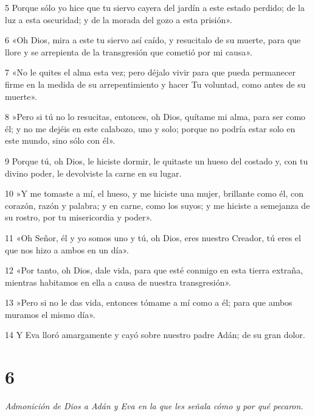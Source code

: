 \par 5 Porque sólo yo hice que tu siervo cayera del jardín a este estado perdido; de la luz a esta oscuridad; y de la morada del gozo a esta prisión».

\par 6 «Oh Dios, mira a este tu siervo así caído, y resucitalo de su muerte, para que llore y se arrepienta de la transgresión que cometió por mi causa».

\par 7 «No le quites el alma esta vez; pero déjalo vivir para que pueda permanecer firme en la medida de su arrepentimiento y hacer Tu voluntad, como antes de su muerte».

\par 8 »Pero si tú no lo resucitas, entonces, oh Dios, quítame mi alma, para ser como él; y no me dejéis en este calabozo, uno y solo; porque no podría estar solo en este mundo, sino sólo con él».

\par 9 Porque tú, oh Dios, le hiciste dormir, le quitaste un hueso del costado y, con tu divino poder, le devolviste la carne en su lugar.

\par 10 »Y me tomaste a mí, el hueso, y me hiciste una mujer, brillante como él, con corazón, razón y palabra; y en carne, como los suyos; y me hiciste a semejanza de su rostro, por tu misericordia y poder».

\par 11 «Oh Señor, él y yo somos uno y tú, oh Dios, eres nuestro Creador, tú eres el que nos hizo a ambos en un día».

\par 12 «Por tanto, oh Dios, dale vida, para que esté conmigo en esta tierra extraña, mientras habitamos en ella a causa de nuestra transgresión».

\par 13 »Pero si no le das vida, entonces tómame a mí como a él; para que ambos muramos el mismo día».

\par 14 Y Eva lloró amargamente y cayó sobre nuestro padre Adán; de su gran dolor.

\chapter{6}

\par \textit{Admonición de Dios a Adán y Eva en la que les señala cómo y por qué pecaron.}

